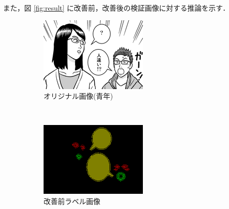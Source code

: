 \documentclass[onecolumn]{ujarticle}   %
\begin{document}
	また，図 \ref{fig:result} に改善前，改善後の検証画像に対する推論を示す．

	\begin{figure}[hb]
		\centering
		\begin{subfigure}{0.49\columnwidth}
			\centering
			\includegraphics[width=1.0\columnwidth]{data/original_test_2.png}
				\caption{オリジナル画像(青年)}
		\end{subfigure}\\
		\begin{subfigure}{0.49\columnwidth}
			\centering
			\includegraphics[width=1.0\columnwidth]{data/label_test_2.png}
				\caption{改善前ラベル画像}
		\end{subfigure}
		\begin{subfigure}{0.49\columnwidth}
			\centering

\end{subfigure}
\end{figure}
\end{document}
